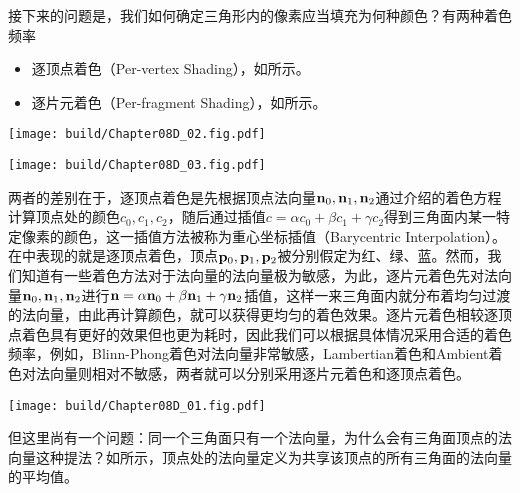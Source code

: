 接下来的问题是，我们如何确定三角形内的像素应当填充为何种颜色？有两种着色频率
\begin{itemize}
    \item 逐顶点着色（Per-vertex Shading），如所示。
    \item 逐片元着色（Per-fragment Shading），如所示。
\end{itemize}
\begin{Figure}[着色频率]
    \begin{FigureSub}[逐顶点着色]
        \texttt{[image: build/Chapter08D\_02.fig.pdf]}
    \end{FigureSub}
    \hspace{0.5cm}
    \begin{FigureSub}[逐片元着色]
        \texttt{[image: build/Chapter08D\_03.fig.pdf]}
    \end{FigureSub}
\end{Figure}
两者的差别在于，逐顶点着色是先根据顶点法向量$\vb{n}_0,\vb{n}_1,\vb{n}_2$通过介绍的着色方程计算顶点处的颜色$c_0,c_1,c_2$，随后通过插值$c=\alpha c_0+\beta c_1+\gamma c_2$得到三角面内某一特定像素的颜色，这一插值方法被称为重心坐标插值（Barycentric Interpolation）。在中表现的就是逐顶点着色，顶点$\vb{p}_0,\vb{p}_1,\vb{p}_2$被分别假定为红、绿、蓝。然而，我们知道有一些着色方法对于法向量的法向量极为敏感，为此，逐片元着色先对法向量$\vb{n}_0,\vb{n}_1,\vb{n}_2$进行$\vb{n}=\alpha\vb{n}_0+\beta\vb{n}_1+\gamma\vb{n}_2$插值，这样一来三角面内就分布着均匀过渡的法向量，由此再计算颜色，就可以获得更均匀的着色效果。逐片元着色相较逐顶点着色具有更好的效果但也更为耗时，因此我们可以根据具体情况采用合适的着色频率，例如，Blinn-Phong着色对法向量非常敏感，Lambertian着色和Ambient着色对法向量则相对不敏感，两者就可以分别采用逐片元着色和逐顶点着色。

\begin{Figure}[顶点处的法向量]
    \texttt{[image: build/Chapter08D\_01.fig.pdf]}
\end{Figure}

但这里尚有一个问题：同一个三角面只有一个法向量，为什么会有三角面顶点的法向量这种提法？如所示，顶点处的法向量定义为共享该顶点的所有三角面的法向量的平均值。
